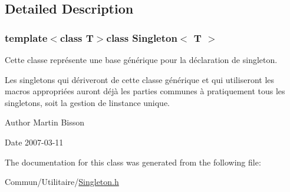 \subsection{Detailed Description}
\subsubsection*{template$<$class T$>$class Singleton$<$ T $>$}

Cette classe représente une base générique pour la déclaration de singleton. 

Les singletons qui dériveront de cette classe générique et qui utiliseront les macros appropriées auront déjà les parties communes à pratiquement tous les singletons, soit la gestion de l\textquotesingle{}instance unique.

\begin{DoxyAuthor}{Author}
Martin Bisson 
\end{DoxyAuthor}
\begin{DoxyDate}{Date}
2007-\/03-\/11 
\end{DoxyDate}


The documentation for this class was generated from the following file\+:\begin{DoxyCompactItemize}
\item 
Commun/\+Utilitaire/\hyperlink{_singleton_8h}{Singleton.\+h}\end{DoxyCompactItemize}
